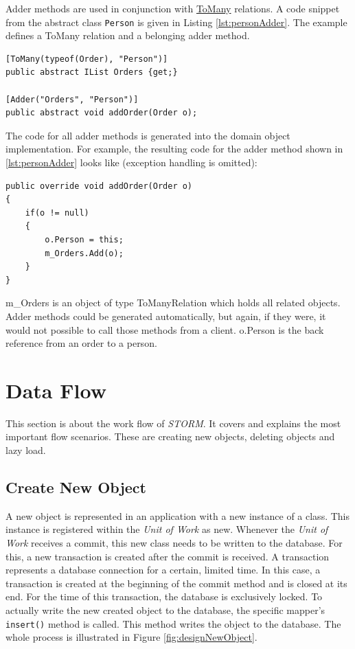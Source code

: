 		Adder methods are used in conjunction with \hyperlink{ToManyAttribute}{ToMany}
		relations. A code snippet from the abstract class \verb~Person~ is given in Listing
		\ref{lst:personAdder}. The example defines a ToMany relation and a belonging adder method.
		
		\begin{lstlisting}[float=htb,language={[Sharp]C},caption=Defining an Adder Method,
			label=lst:personAdder]
[ToMany(typeof(Order), "Person")]
public abstract IList Orders {get;}

[Adder("Orders", "Person")]
public abstract void addOrder(Order o);
		\end{lstlisting}
		
		The code for all adder methods is generated into the domain object implementation.
		For example, the resulting code for the adder method shown in \ref{lst:personAdder}
		looks like (exception handling is omitted):
		
		\begin{lstlisting}[float=htb,language={[Sharp]C},caption=Defining an Adder Method,
			label=lst:personAdderImpl]
public override void addOrder(Order o)
{
	if(o != null)
	{
		o.Person = this;
		m_Orders.Add(o);
	}
}
	\end{lstlisting}
	
	m\_Orders is an object of type ToManyRelation which holds all related objects. Adder methods
	could be generated automatically, but again, if they were, it would not possible to call
	those methods from a client. o.Person is the back reference from an order to a person.
	
	\section{Data Flow}
		This section is about the work flow of \textit{STORM}. It covers and explains
		the most important flow scenarios. These are creating new objects, deleting objects and lazy load.
		
		\subsection{Create New Object}
			A new object is represented in an application with a new instance of a class. This
			instance is registered within the \textit{Unit of Work} as new. Whenever the \textit{Unit of Work} 
			receives a commit, this new class needs to be written to the database. For this, a new
			transaction is created after the commit is received. A transaction represents a database connection
			for a certain, limited time. In this case, a transaction is created at the beginning of the
			commit method and is closed at its end. For the time of this transaction, the database
			is exclusively locked. To actually write the new created object to the
			database, the specific mapper's \verb~insert()~ method is called. This method 
			writes the object to the database. The whole process is illustrated in Figure
			\ref{fig:designNewObject}.
			
